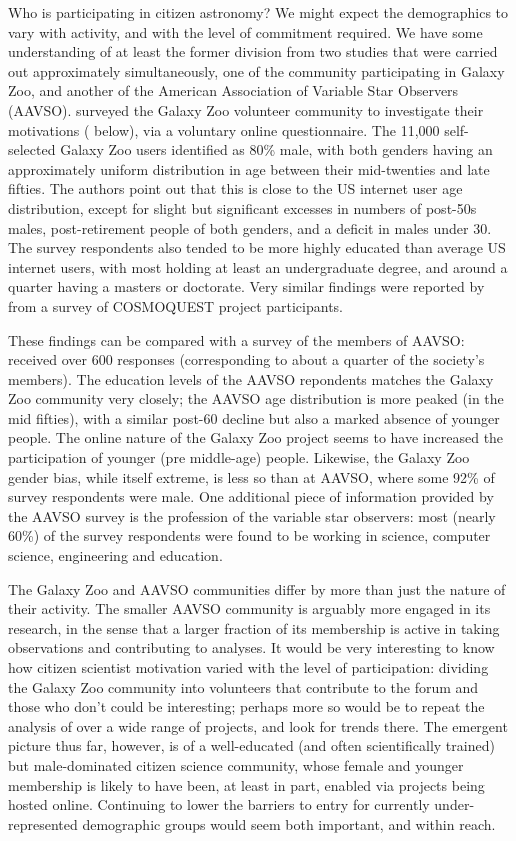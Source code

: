 \documentclass{ar2e}
\begin{document}
Who is participating in citizen astronomy? We might expect the demographics to
vary with activity, and with the level of commitment required. We have some
understanding of at least the former division from two studies that were
carried out approximately simultaneously, one of the community  participating
in Galaxy Zoo, and another of the American Association of Variable Star
Observers (AAVSO).  \citet{Rad++2013} surveyed the Galaxy Zoo volunteer
community to investigate their motivations (
below), via a voluntary online questionnaire. The 11,000 self-selected Galaxy
Zoo users identified as 80\% male, with both genders having an approximately
uniform distribution in age between their mid-twenties and late fifties. The
authors point out that this is close to the US internet user age distribution,
except for slight but significant excesses in numbers of post-50s males,
post-retirement people of both genders, and a deficit in males under 30. The
survey respondents  also tended to be more highly educated than average US
internet users, with most holding at least an undergraduate degree, and around
a quarter having a masters or doctorate. Very similar findings were reported
by \citet{COSMOQUESTsurvey} from a survey of COSMOQUEST project participants.

These findings can be compared with a survey of the members of AAVSO:
\citet{P+P2012} received over 600 responses (corresponding to about a quarter
of the society's members). The education levels of
the AAVSO repondents matches the Galaxy Zoo community very closely; the AAVSO
age distribution is more peaked (in the mid fifties), with a similar post-60
decline but also a marked absence of younger people. The online nature of the
Galaxy Zoo project seems to have increased the participation of younger (pre
middle-age) people. Likewise, the Galaxy Zoo gender bias, while itself
extreme, is less so than at AAVSO, where some 92\% of survey respondents were
male. One additional piece of information provided by the AAVSO survey is the
profession of the variable star observers: most (nearly 60\%) of the survey
respondents were found to be working in science, computer science, engineering
and education. 

The Galaxy Zoo and AAVSO communities differ by more than just the nature of
their activity. The smaller AAVSO community is arguably more engaged in its
research, in the sense that a larger fraction of its membership is active in
taking observations and contributing to analyses. It would be very interesting
to know how citizen scientist motivation varied with the level of
participation: dividing the Galaxy Zoo community into volunteers that
contribute to the  forum and those who don't could be interesting; perhaps
more so would be to repeat the analysis of \citeauthor{Rad++2013} over a wide
range of projects, and look for trends there. The emergent picture thus far,
however, is of a well-educated (and often scientifically trained)  but
male-dominated citizen science community, whose female and younger membership
is likely to have been, at least in part, enabled via projects being hosted
online. Continuing to lower the barriers to entry for currently
under-represented demographic groups would seem both important, and within
reach.
\end{document}
